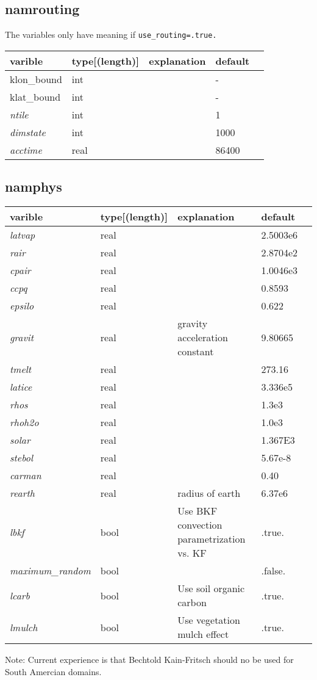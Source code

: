 \documentclass{article}
\begin{document}
\subsection{namrouting}
The variables only have meaning if \verb+use_routing=.true.+

\noindent
\begin{tabular}{|l|l|l|l|l|}
  \hline
  varible & type[(length)] & explanation & default \\
  \hline
  \hline
  klon\_bound & int & & - \\
  klat\_bound & int & & - \\
  \emph{ntile} & int & & 1 \\
  \emph{dimstate} & int & & 1000 \\
  \emph{acctime} & real & & 86400 \\
  \hline
\end{tabular}


\subsection{namphys}
\begin{tabular}{|l|l|l|l|l|}
  \hline
  varible & type[(length)] & explanation & default \\
  \hline
  \hline
  \emph{latvap} & real &  & 2.5003e6\\
  \emph{rair} & real &  & 2.8704e2 \\
  \emph{cpair}& real &  & 1.0046e3 \\
  \emph{ccpq}& real &  & 0.8593 \\
  \emph{epsilo} & real &  & 0.622 \\
  \emph{gravit} & real & gravity acceleration constant & 9.80665 \\
  \emph{tmelt} & real &  & 273.16 \\
  \emph{latice} & real &  & 3.336e5 \\ 
  \emph{rhos} & real &  & 1.3e3 \\
  \emph{rhoh2o} & real &  & 1.0e3 \\
  \emph{solar} & real &  & 1.367E3 \\
  \emph{stebol} & real &  & 5.67e-8 \\
  \emph{carman} & real &  & 0.40 \\
  \emph{rearth} & real & radius of earth & 6.37e6  \\
  \emph{lbkf} & bool & Use BKF convection parametrization vs. KF & .true. \\
  \emph{maximum\_random} & bool &   & .false. \\ 
  \emph{lcarb} & bool & Use soil organic carbon  & .true. \\ 
  \emph{lmulch} & bool & Use vegetation mulch effect  & .true. \\ 
\hline
\end{tabular}
Note: Current experience is that Bechtold Kain-Fritsch should no be used for South Amercian domains.
\end{document}
